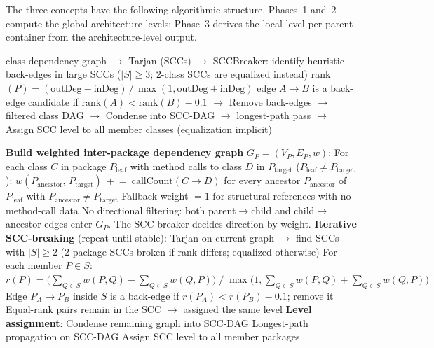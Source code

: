 \documentclass[a4paper,twoside]{article}
\begin{document}
The three concepts have the following algorithmic structure. Phases~1 and~2
compute the global architecture levels; Phase~3 derives the local level
per parent container from the architecture-level output.

\begin{algorithm}[H]
\DontPrintSemicolon
\caption{Phase~1 -- Global Class Levels (\texttt{LevelCalculator}, Step~3)}
class dependency graph\;
\Indp $\rightarrow$ Tarjan (SCCs)\;
$\rightarrow$ SCCBreaker: identify heuristic back-edges in large SCCs ($|S| \geq 3$; 2-class SCCs are equalized instead)\;
\hspace{1.5em} rank$(P)=(\text{outDeg}-\text{inDeg})\,/\,\max(1,\text{outDeg}+\text{inDeg})$\;
\hspace{1.5em} edge $A\!\to\!B$ is a back-edge candidate if $\text{rank}(A)<\text{rank}(B)-0.1$\;
$\rightarrow$ Remove back-edges $\rightarrow$ filtered class DAG\;
$\rightarrow$ Condense into SCC-DAG $\rightarrow$ longest-path pass\;
$\rightarrow$ Assign SCC level to all member classes (equalization implicit)\;\Indm
\end{algorithm}

\begin{algorithm}[H]
\DontPrintSemicolon
\caption{Phase~2 -- Package Architecture Levels (\texttt{LevelCalculator}, Step~4)}
\textbf{Build weighted inter-package dependency graph} $G_P=(V_P,E_P,w)$:\;
\Indp
  For each class $C$ in package $P_\text{leaf}$ with method calls to class $D$ in $P_\text{target}$ ($P_\text{leaf} \ne P_\text{target}$):\;
  \hspace{1em} $w(P_\text{ancestor},\, P_\text{target})\ \mathrel{+}=\ \text{callCount}(C \to D)$\;
  \hspace{1em} for every ancestor $P_\text{ancestor}$ of $P_\text{leaf}$ with $P_\text{ancestor} \ne P_\text{target}$\;
  Fallback weight $= 1$ for structural references with no method-call data\;
  No directional filtering: both parent$\to$child and child$\to$ancestor edges enter $G_P$. The SCC breaker decides direction by weight.\;
\Indm
\BlankLine
\textbf{Iterative SCC-breaking} (repeat until stable):\;
\Indp
  Tarjan on current graph $\rightarrow$ find SCCs with $|S|\ge 2$ (2-package SCCs broken if rank differs; equalized otherwise)\;\;
  For each member $P \in S$:\;
  \hspace{1em} $r(P) = \bigl(\sum_{Q\in S}w(P,Q)-\sum_{Q\in S}w(Q,P)\bigr)\;/\;\max\!\bigl(1,\textstyle\sum_{Q\in S}w(P,Q)+\sum_{Q\in S}w(Q,P)\bigr)$\;
  Edge $P_A\!\to\!P_B$ inside $S$ is a back-edge if $r(P_A) < r(P_B) - 0.1$; remove it\;
  Equal-rank pairs remain in the SCC $\rightarrow$ assigned the same level\;
\Indm
\BlankLine
\textbf{Level assignment}:\;
\Indp
  Condense remaining graph into SCC-DAG\;
  Longest-path propagation on SCC-DAG\;
  Assign SCC level to all member packages\;
\Indm
\end{algorithm}
\end{document}
